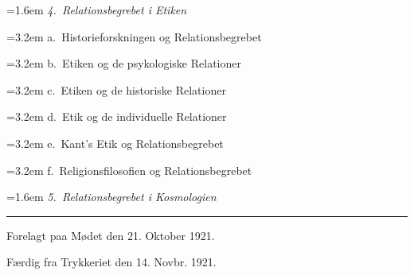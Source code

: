 \documentclass[12pt]{article}
\begin{document}
\hangindent=1.6em \emph{4.~Relationsbegrebet i Etiken}\par
\hangindent=3.2em \hspace*{1.6em}a.~Historieforskningen og Relationsbegrebet\par
\hangindent=3.2em \hspace*{1.6em}b.~Etiken og de psykologiske Relationer\par
\hangindent=3.2em \hspace*{1.6em}c.~Etiken og de historiske Relationer\par
\hangindent=3.2em \hspace*{1.6em}d.~Etik og de individuelle Relationer\par
\hangindent=3.2em \hspace*{1.6em}e.~Kant's Etik og Relationsbegrebet\par
\hangindent=3.2em \hspace*{1.6em}f.~Religionsfilosofien og Relationsbegrebet\par
\hangindent=1.6em \emph{5.~Relationsbegrebet i Kosmologien}\par
\endgroup
\vspace{5ex}
{\centering\rule{2.4cm}{0.4pt}\par}
\vspace{2ex}
{\centering\small Forelagt paa Mødet den 21. Oktober 1921.\par
Færdig fra Trykkeriet den 14. Novbr. 1921.\par}
\end{document}
